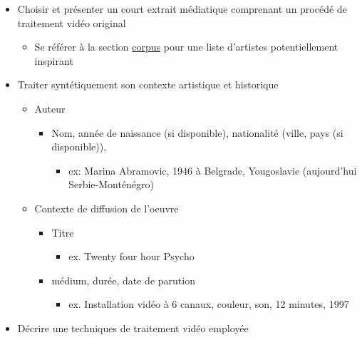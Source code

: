 \documentclass[
]{book}
\providecommand{\tightlist}{%
  \setlength{\itemsep}{0pt}\setlength{\parskip}{0pt}}
\begin{document}
\begin{itemize}
\tightlist
\item
  Choisir et présenter un court extrait médiatique comprenant un procédé de traitement vidéo original

  \begin{itemize}
  \tightlist
  \item
    Se référer à la section \protect\hyperlink{corpus}{corpus} pour une liste d'artistes potentiellement inspirant
  \end{itemize}
\item
  Traiter syntétiquement son contexte artistique et historique

  \begin{itemize}
  \tightlist
  \item
    Auteur

    \begin{itemize}
    \tightlist
    \item
      Nom, année de naissance (si disponible), nationalité (ville, pays (si disponible)),

      \begin{itemize}
      \tightlist
      \item
        ex: Marina Abramovic, 1946 à Belgrade, Yougoslavie (aujourd'hui Serbie-Monténégro)
      \end{itemize}
    \end{itemize}
  \item
    Contexte de diffusion de l'oeuvre

    \begin{itemize}
    \tightlist
    \item
      Titre

      \begin{itemize}
      \tightlist
      \item
        ex. Twenty four hour Psycho
      \end{itemize}
    \item
      médium, durée, date de parution

      \begin{itemize}
      \tightlist
      \item
        ex. Installation vidéo à 6 canaux, couleur, son, 12 minutes, 1997
      \end{itemize}
    \end{itemize}
  \end{itemize}
\item
  Décrire une techniques de traitement vidéo employée


\end{itemize}
\end{document}
